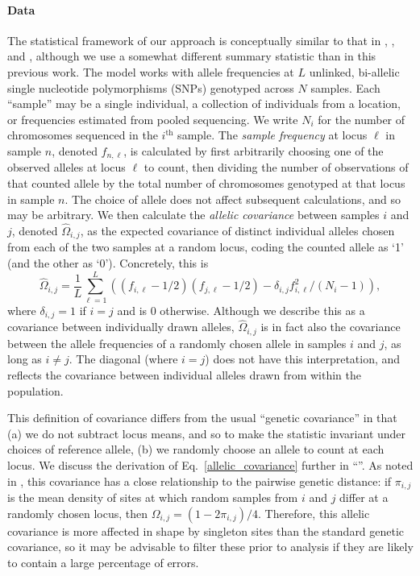 \documentclass[10pt,letterpaper]{article}
\newcommand{\secref}[1]{``\nameref{#1}''}
\begin{document}
\paragraph{Data}
The statistical framework of our approach is conceptually similar to that in \cite{Wasser2004}, \cite{BEDASSLE}, and \cite{spacemix},
although we use a somewhat different summary statistic than in this previous work.
The model works with allele frequencies at $L$ unlinked, bi-allelic single nucleotide polymorphisms (SNPs) genotyped across $N$ samples.
Each ``sample'' may be a single individual,  
a collection of individuals from a location, 
or frequencies estimated from pooled sequencing.
We write $N_i$ for the number of chromosomes sequenced in the $i^\text{th}$ sample.
The \emph{sample frequency} at locus $\ell$ in sample $n$, denoted $f_{n,\ell}$, 
is calculated by first arbitrarily choosing one of the observed alleles at locus $\ell$ to count, 
then dividing the number of observations of that counted allele by the total number of chromosomes genotyped at that locus
in sample $n$.
The choice of allele does not affect subsequent calculations, and so may be arbitrary.
We then calculate the \emph{allelic covariance} between samples $i$ and $j$, denoted $\widehat{\Omega}_{i,j}$,
as the expected covariance of distinct individual alleles 
chosen from each of the two samples at a random locus,
coding the counted allele as `1' (and the other as `0').
Concretely, this is
\begin{equation}
\widehat{\Omega}_{i,j} = 
    \frac{1}{L} \sum_{\ell=1}^L \left( (f_{i,\ell}-1/2) (f_{j,\ell}-1/2) - \delta_{i,j} f_{i,\ell}^2 / (N_i-1) \right),
\label{allelic_covariance}
\end{equation}
where $\delta_{i,j}=1$ if $i=j$ and is 0 otherwise.
Although we describe this as a covariance between individually drawn alleles,
$\widehat{\Omega}_{i,j}$ is in fact also the covariance between the allele frequencies
of a randomly chosen allele in samples $i$ and $j$, as long as $i \neq j$.
The diagonal (where $i=j$) does not have this interpretation, 
and reflects the covariance between individual alleles drawn from within the population.

This definition of covariance differs from the usual ``genetic covariance'' \cite{mcvean_genealogical_2009}
in that (a) we do not subtract locus means,
and so to make the statistic invariant under choices of reference allele, 
(b) we randomly choose an allele to count at each locus.
We discuss the derivation of Eq.\ \eqref{allelic_covariance} further in \secref{allelic_cov}.
As noted in \cite{EEMS},
this covariance has a close relationship to the pairwise genetic distance:
if $\pi_{i,j}$ is the mean density of sites at which random samples from $i$ and $j$ differ at a randomly chosen locus,
then $\Omega_{i,j} = (1 - 2 \pi_{i,j})/4$.
Therefore, 
this allelic covariance is more affected in shape by singleton sites
than the standard genetic covariance,
so it may be advisable to filter these prior to analysis
if they are likely to contain a large percentage of errors.
\end{document}
